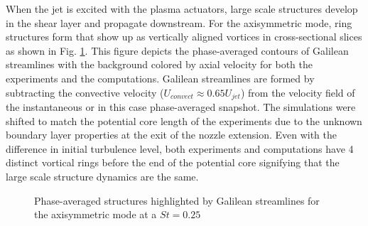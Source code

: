 \documentclass[english]{aiaa-tc}
\begin{document}
When the jet is excited with the plasma actuators, large scale structures develop in the shear layer and propagate downstream. For the axisymmetric mode, ring structures form that show up as vertically aligned vortices in cross-sectional slices as shown in Fig. \ref{galilcomp}. This figure depicts the phase-averaged contours of Galilean streamlines with the background colored by axial velocity for both the experiments and the computations. Galilean streamlines are formed by subtracting the convective velocity ($U_{convect}\approx0.65U_{jet}$) from the velocity field of the instantaneous or in this case phase-averaged snapshot. The simulations were shifted to match the potential core length of the experiments due to the unknown boundary layer properties at the exit of the nozzle extension. Even with the difference in initial turbulence level, both experiments and computations have 4 distinct vortical rings before the end of the potential core signifying that the large scale structure dynamics are the same.
\begin{figure}
\begin{center}
\caption{Phase-averaged structures highlighted by Galilean streamlines for the axisymmetric mode at a $St=0.25$\label{galilcomp}}
\end{center}
 \end{figure}
\end{document}
